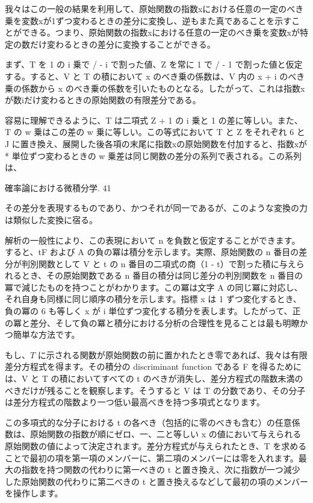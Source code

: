 \documentclass[a4paper,11pt,openany]{ltjsbook}
\begin{document}
我々はこの一般の結果を利用して、原始関数の指数xにおける任意の一定のべき乗を変数xが1ずつ変わるときの差分に変換し、逆もまた真であることを示すことができる。つまり、原始関数の指数xにおける任意の一定のべき乗を変数xが特定の数だけ変わるときの差分に変換することができる。

まず、T を 1 の i 乗で / - i で割った値、Z を常に 1 で / - 1 で割った値と仮定する。すると、V と T の積において x のべき乗の係数は、V 内の x + i のべき乗の係数から x のべき乗の係数を引いたものとなる。したがって、これは指数xが数iだけ変わるときの原始関数の有限差分である。

容易に理解できるように、T は二項式 Z + 1 の i 乗と 1 の差に等しい。また、T の w 乗はこの差の w 乗に等しい。この等式において T と Z をそれぞれ 6 と J に置き換え、展開した後各項の末尾に指数xの原始関数を付加すると、指数xが * 単位ずつ変わるときの w 乗差は同じ関数の差分の系列で表される。この系列は、

確率論における微積分学. 41

その差分を表現するものであり、かつそれが同一であるが、このような変換の力は類似した変換に宿る。

解析の一般性により、この表現において n を負数と仮定することができます。すると、tF および A の負の冪は積分を示します。実際、原始関数の n 番目の差分が判別関数として V と t の n 番目の二項式の商（1 - t）で割った積に与えられるとき、その原始関数である n 番目の積分は同じ差分の判別関数を n 番目の冪で減じたものを持つことがわかります。この冪は文字 A の同じ冪に対応し、それ自身も同様に同じ順序の積分を示します。指標 x は 1 ずつ変化するとき、負の冪の 6 も等しく x が i 単位ずつ変化する積分を表します。したがって、正の冪と差分、そして負の冪と積分における分析の合理性を見ることは最も明瞭かつ簡単な方法です。

もし、$T$ に示される関数が原始関数の前に置かれたとき零であれば、我々は有限差分方程式を得ます。その積分の discriminant function である F を得るためには、V と T の積においてすべての t のべきが消失し、差分方程式の階数未満のべきだけが残ることを観察します。そうすると V は T の分数であり、その分子は差分方程式の階数より一つ低い最高べきを持つ多項式となります。

この多項式的な分子における t の各べき（包括的に零のべきも含む）の任意係数は、原始関数の指数が順にゼロ、一、二と等しい x の値において与えられる原始関数の値によって決定されます。差分方程式が与えられたとき、T を求めることで最初の項を第一項のメンバーに、第二項のメンバーには零を入れます。最大の指数を持つ関数の代わりに第一べきの t と置き換え、次に指数が一つ減少した原始関数の代わりに第二べきの t と置き換えるなどして最初の項のメンバーを操作します。
\end{document}
